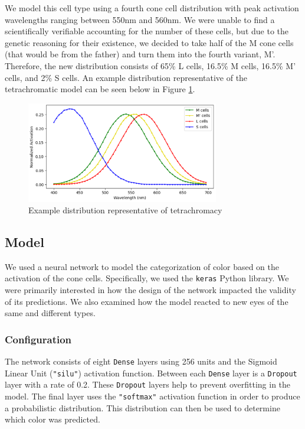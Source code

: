 \documentclass[titlepage]{article}
\begin{document}
We model this cell type using a fourth cone cell distribution with peak activation wavelengths ranging between 550nm and 560nm. We were unable to find a scientifically verifiable accounting for the number of these cells, but due to the genetic reasoning for their existence, we decided to take half of the M cone cells (that would be from the father) and turn them into the fourth variant, M'. Therefore, the new distribution consists of 65\% L cells, 16.5\% M cells, 16.5\% M' cells, and 2\% S cells. An example distribution representative of the tetrachromatic model can be seen below in Figure \ref{fig:our_tetrachromatic}. 

\begin{figure}[H]
    \centering
    \includegraphics[width=0.75\textwidth]{figs/our_tetrachromatic.png}
    \caption{Example distribution representative of tetrachromacy}
    \label{fig:our_tetrachromatic}
\end{figure}

\subsection{Model}

We used a neural network to model the categorization of color based on the activation of the cone cells. Specifically, we used the \lstinline{keras} Python library. We were primarily interested in how the design of the network impacted the validity of its predictions. We also examined how the model reacted to new eyes of the same and different types.

\subsubsection{Configuration}

The network consists of eight \lstinline{Dense} layers using 256 units and the Sigmoid Linear Unit (\lstinline{"silu"}) activation function. Between each \lstinline{Dense} layer is a \lstinline{Dropout} layer with a rate of 0.2. These \lstinline{Dropout} layers help to prevent overfitting in the model. The final layer uses the \lstinline{"softmax"} activation function in order to produce a probabilistic distribution. This distribution can then be used to determine which color was predicted.
\end{document}
